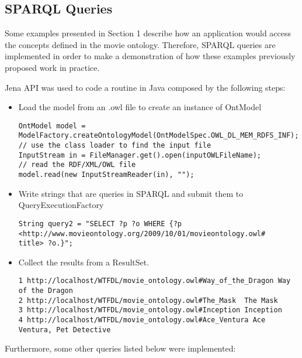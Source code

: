 \subsection{SPARQL Queries}
Some examples presented in Section 1 describe how an application would access the concepts defined in the movie ontology.
Therefore, SPARQL queries are implemented in order to make a demonstration of how these examples previously proposed work in practice.

Jena API was used to code a routine in Java composed by the following steps:

\begin{itemize}
  \item Load the model from an .owl file to create an instance of OntModel
\begin{lstlisting}
OntModel model = ModelFactory.createOntologyModel(OntModelSpec.OWL_DL_MEM_RDFS_INF);
// use the class loader to find the input file
InputStream in = FileManager.get().open(inputOWLFileName);
// read the RDF/XML/OWL file
model.read(new InputStreamReader(in), "");
\end{lstlisting}

  \item Write strings that are queries in SPARQL and submit them to QueryExecutionFactory
\begin{lstlisting}
String query2 = "SELECT ?p ?o WHERE {?p <http://www.movieontology.org/2009/10/01/movieontology.owl#
title> ?o.}";
\end{lstlisting}

  \item Collect the results from a ResultSet.
\begin{lstlisting}
1 http://localhost/WTFDL/movie_ontology.owl#Way_of_the_Dragon Way of the Dragon 
2 http://localhost/WTFDL/movie_ontology.owl#The_Mask  The Mask  
3 http://localhost/WTFDL/movie_ontology.owl#Inception Inception 
4 http://localhost/WTFDL/movie_ontology.owl#Ace_Ventura Ace Ventura, Pet Detective  
\end{lstlisting}

\end{itemize}

Furthermore, some other queries listed below were implemented:

